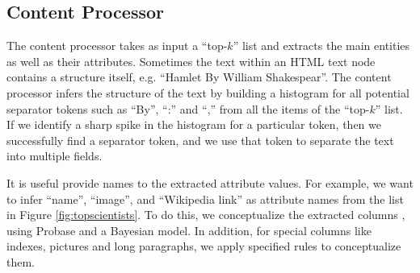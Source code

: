 \subsection{Content Processor}
The content processor takes as input a ``top-$k$'' list and
extracts the main entities as well
as their attributes.
Sometimes the text within an HTML text node contains a structure itself, e.g.
``Hamlet By William Shakespear''. The content processor infers the structure of
the text \cite{Fisher08:dirttoshovels} by building a histogram for
all potential separator tokens such as ``By'', ``:'' and ``,'' from all the items
of the ``top-$k$'' list. If we identify a sharp spike in the histogram for a
particular token, then we successfully find a separator token, and we use that
token to separate the text into multiple fields.

It is useful provide names to the extracted attribute values. For example,
we want to infer ``name'', ``image'', and ``Wikipedia link'' as
attribute names from the list in Figure \ref{fig:topscientists}.
To do this, we conceptualize the extracted columns \cite{Song11:Conceptualize},
using Probase and a Bayesian model.
In addition, for special columns like indexes, pictures and long paragraphs,
we apply specified rules to conceptualize them.

